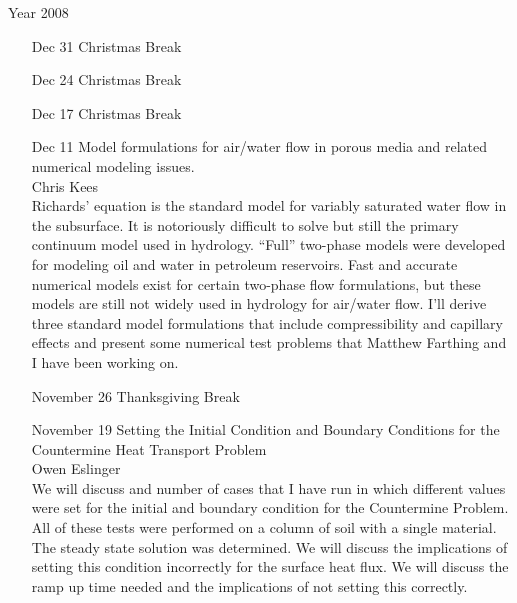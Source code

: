 \documentclass[12]{article}
\begin{document}
\begin{center}
\Large
Year 2008
\end{center}

\begin{enumerate}

\item[Dec 31] Christmas Break

\item[Dec 24] Christmas Break

\item[Dec 17] Christmas Break

\item[Dec 11] Model formulations for air/water flow in porous media and related numerical modeling issues.\\ Chris Kees\\
  Richards' equation is the standard model for variably saturated water flow in the subsurface.  It is notoriously difficult to solve but still the primary continuum model used in hydrology.  ``Full'' two-phase models were developed for modeling oil and water in petroleum reservoirs.  Fast and accurate numerical models exist for certain two-phase flow formulations, but these models are still not widely used in hydrology for air/water flow.  I'll derive three standard model formulations that include compressibility and capillary effects and present some numerical test problems that Matthew Farthing and I have been working on.


\item[November 26] Thanksgiving Break

\item[November 19] Setting the Initial Condition and Boundary Conditions for the Countermine Heat Transport Problem\\ Owen Eslinger\\
  We will discuss and number of cases that I have run in which different values were set for the initial and boundary condition for the Countermine Problem.  All of these tests were performed on a column of soil with a single material.  The steady state solution was determined.  We will discuss the implications of setting this condition incorrectly for the surface heat flux.  We will discuss the ramp up time needed and the implications of not setting this correctly.


\end{enumerate}
\end{document}
